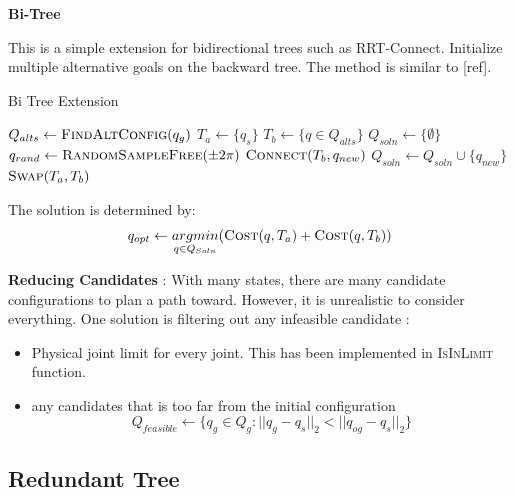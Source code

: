 \textbf{Bi-Tree}


This is a simple extension for bidirectional trees such as RRT-Connect. Initialize multiple alternative goals on the backward tree. The method is similar to [ref].

\begin{algorithm}[!h]
    \small
    \caption{Bi Tree Extension}

    \begin{algorithmic}
        \State $Q_{alts} \gets \textsc{FindAltConfig}(q_g)$
        \State $T_a \gets \{q_{s}\}$
        \State $T_b \gets \{q \in Q_{alts}\}$
        \State $Q_{soln} \gets \{\emptyset\} $
        \State $q_{rand} \gets \textsc{RandomSampleFree}(\pm 2\pi)$
        \State $\textsc{Connect}(T_b, q_{new})$
        \State $Q_{soln} \gets Q_{soln} \cup \{q_{new}\}$
        \EndIf
        \State $\textsc{Swap}(T_a,T_b)$
        \EndFor
    \end{algorithmic}
\end{algorithm}

The solution is determined by:
\begin{equation}
    q_{opt} \gets \underset{q \in Q_{Soln}}{argmin}(\textsc{Cost}(q, T_a) + \textsc{Cost}(q, T_b))
\end{equation}


\textbf{Reducing Candidates} : With many states, there are many candidate configurations to plan a path toward. However, it is unrealistic to consider everything. One solution is filtering out any infeasible candidate :
\begin{itemize}
    \item Physical joint limit for every joint. This has been implemented in \textsc{IsInLimit} function.
    \item any candidates that is too far from the initial configuration
    \begin{equation}
        Q_{feasible} \gets \{q_g \in Q_g : || q_g - q_s ||_2 < || q_{og} - q_s ||_2\}
    \end{equation}
\end{itemize}





\subsection{Redundant Tree}


